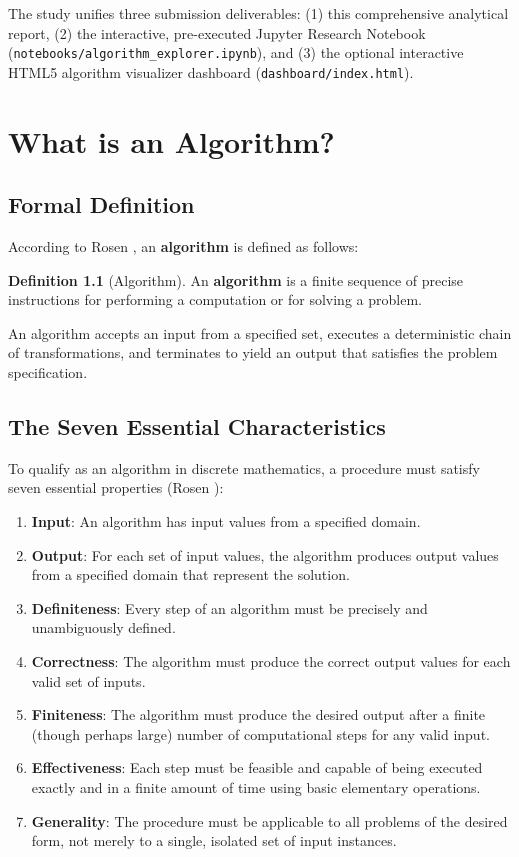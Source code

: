 \documentclass[11pt,a4paper,oneside]{report}
\theoremstyle{definition}
\newtheorem{definition}{Definition}[chapter]
\begin{document}
The study unifies three submission deliverables: (1) this comprehensive analytical report, (2) the interactive, pre-executed Jupyter Research Notebook (\texttt{notebooks/algorithm\_explorer.ipynb}), and (3) the optional interactive HTML5 algorithm visualizer dashboard (\texttt{dashboard/index.html}).

\chapter{What is an Algorithm?}
\label{chap:what_is_an_algorithm}

\section{Formal Definition}
According to Rosen \cite[\S3.1]{Rosen2019}, an \textbf{algorithm} is defined as follows:
\begin{definition}[Algorithm]
An \textbf{algorithm} is a finite sequence of precise instructions for performing a computation or for solving a problem.
\end{definition}

An algorithm accepts an input from a specified set, executes a deterministic chain of transformations, and terminates to yield an output that satisfies the problem specification.

\section{The Seven Essential Characteristics}
To qualify as an algorithm in discrete mathematics, a procedure must satisfy seven essential properties (Rosen \cite[\S3.1]{Rosen2019}):
\begin{enumerate}
    \item \textbf{Input}: An algorithm has input values from a specified domain.
    \item \textbf{Output}: For each set of input values, the algorithm produces output values from a specified domain that represent the solution.
    \item \textbf{Definiteness}: Every step of an algorithm must be precisely and unambiguously defined.
    \item \textbf{Correctness}: The algorithm must produce the correct output values for each valid set of inputs.
    \item \textbf{Finiteness}: The algorithm must produce the desired output after a finite (though perhaps large) number of computational steps for any valid input.
    \item \textbf{Effectiveness}: Each step must be feasible and capable of being executed exactly and in a finite amount of time using basic elementary operations.
    \item \textbf{Generality}: The procedure must be applicable to all problems of the desired form, not merely to a single, isolated set of input instances.
\end{enumerate}
\end{document}
